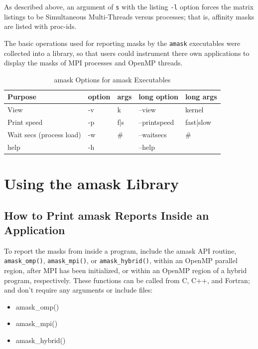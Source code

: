 \documentclass[10pt,a4paper]{report}
\begin{document}
As described above, an argument of \verb+s+ with the listing \verb+-l+ option forces the 
matrix listings to be Simultaneous Multi-Threads versus
processes; that is, affinity masks are listed with proc-ids. 


The basic operations used for reporting masks by the \verb+amask+ executables
were collected into a library, so that users
could instrument there own applications to display the masks of MPI processes
and OpenMP threads.

\begin{table}[ht]
\centering
\caption{amask Options for amask Executables}
\label{tab:amaskopts}
\begin{tabular}{|l|l|l|l|l|}
\hline
Purpose                  & option & args & long option  & long args   \\ \hline
View                     & -v     & k    & --view       & kernel      \\ \hline
Print speed              & -p     & f|s  & --printspeed & fast|slow   \\ \hline
Wait secs (process load) & -w     & \#   & --waitsecs   & \#          \\ \hline
help                     & -h     &      & --help       &             \\ \hline
\end{tabular}
\end{table}


\chapter{Using the amask Library}


\section{How to Print amask Reports Inside an Application}

To report the masks from inside a program, include the amask API routine, \verb+amask_omp()+,
\verb+amask_mpi()+, or \verb+amask_hybrid()+, within an OpenMP parallel region, after MPI has been
initialized, or within an OpenMP region of a hybrid program, respectively.  These functions can
be called from C, C++, and Fortran; and don't require any arguments or include files:  

\begin{itemize}
\item amask\_omp()
\item amask\_mpi()
\item amask\_hybrid()
\end{itemize}
\end{document}
